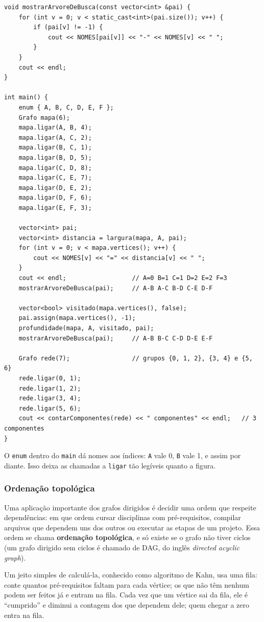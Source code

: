 \begin{codigo}
\begin{Verbatim}[breaklines=true, breaksymbolleft={}, fontsize=\footnotesize]
void mostrarArvoreDeBusca(const vector<int> &pai) {
    for (int v = 0; v < static_cast<int>(pai.size()); v++) {
        if (pai[v] != -1) {
            cout << NOMES[pai[v]] << "-" << NOMES[v] << " ";
        }
    }
    cout << endl;
}

int main() {
    enum { A, B, C, D, E, F };
    Grafo mapa(6);
    mapa.ligar(A, B, 4);
    mapa.ligar(A, C, 2);
    mapa.ligar(B, C, 1);
    mapa.ligar(B, D, 5);
    mapa.ligar(C, D, 8);
    mapa.ligar(C, E, 7);
    mapa.ligar(D, E, 2);
    mapa.ligar(D, F, 6);
    mapa.ligar(E, F, 3);

    vector<int> pai;
    vector<int> distancia = largura(mapa, A, pai);
    for (int v = 0; v < mapa.vertices(); v++) {
        cout << NOMES[v] << "=" << distancia[v] << " ";
    }
    cout << endl;                  // A=0 B=1 C=1 D=2 E=2 F=3
    mostrarArvoreDeBusca(pai);     // A-B A-C B-D C-E D-F

    vector<bool> visitado(mapa.vertices(), false);
    pai.assign(mapa.vertices(), -1);
    profundidade(mapa, A, visitado, pai);
    mostrarArvoreDeBusca(pai);     // A-B B-C C-D D-E E-F

    Grafo rede(7);                 // grupos {0, 1, 2}, {3, 4} e {5, 6}
    rede.ligar(0, 1);
    rede.ligar(1, 2);
    rede.ligar(3, 4);
    rede.ligar(5, 6);
    cout << contarComponentes(rede) << " componentes" << endl;   // 3 componentes
}
\end{Verbatim}
\end{codigo}

O \texttt{enum} dentro do \texttt{main} dá nomes aos índices: \texttt{A} vale 0, \texttt{B} vale 1, e assim por diante. Isso deixa as chamadas a \texttt{ligar} tão legíveis quanto a figura.

\subsubsection{Ordenação topológica}

Uma aplicação importante dos grafos dirigidos é decidir uma ordem que respeite dependências: em que ordem cursar disciplinas com pré-requisitos, compilar arquivos que dependem uns dos outros ou executar as etapas de um projeto. Essa ordem se chama \textbf{ordenação topológica}, e só existe se o grafo não tiver ciclos (um grafo dirigido sem ciclos é chamado de DAG, do inglês \textit{directed acyclic graph}).

Um jeito simples de calculá-la, conhecido como algoritmo de Kahn, usa uma fila: conte quantos pré-requisitos faltam para cada vértice; os que não têm nenhum podem ser feitos já e entram na fila. Cada vez que um vértice sai da fila, ele é ``cumprido'' e diminui a contagem dos que dependem dele; quem chegar a zero entra na fila.

